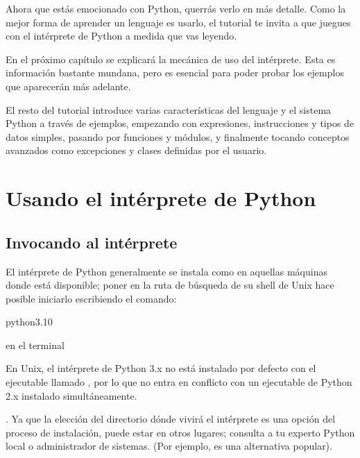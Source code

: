 \documentclass[a4,10pt,spanish]{sphinxmanual}
\begin{document}
\sphinxAtStartPar
Ahora que estás emocionado con Python, querrás verlo en más detalle. Como la mejor forma de aprender un lenguaje es usarlo, el tutorial te invita a que juegues con el intérprete de Python a medida que vas leyendo.

\sphinxAtStartPar
En el próximo capítulo se explicará la mecánica de uso del intérprete. Esta es información bastante mundana, pero es esencial para poder probar los ejemplos que aparecerán más adelante.

\sphinxAtStartPar
El resto del tutorial introduce varias características del lenguaje y el sistema Python a través de ejemplos, empezando con expresiones, instrucciones y tipos de datos simples, pasando por funciones y módulos, y finalmente tocando conceptos avanzados como excepciones y clases definidas por el usuario.


\chapter{Usando el intérprete de Python}
\label{\detokenize{tutorial/interpreter:using-the-python-interpreter}}\label{\detokenize{tutorial/interpreter:tut-using}}\label{\detokenize{tutorial/interpreter::doc}}

\section{Invocando al intérprete}
\label{\detokenize{tutorial/interpreter:invoking-the-interpreter}}\label{\detokenize{tutorial/interpreter:tut-invoking}}
\sphinxAtStartPar
El intérprete de Python generalmente se instala como  en aquellas máquinas donde está disponible; poner  en la ruta de búsqueda de su shell de Unix hace posible iniciarlo escribiendo el comando:

\begin{sphinxVerbatim}[commandchars=\\\{\}]
python3.10
\end{sphinxVerbatim}

\sphinxAtStartPar
en el terminal %
\begin{footnote}[1]\sphinxAtStartFootnote
En Unix, el intérprete de Python 3.x no está instalado por defecto con el ejecutable llamado , por lo que no entra en conflicto con un ejecutable de Python 2.x instalado simultáneamente.
%
\end{footnote}. Ya que la elección del directorio dónde vivirá el intérprete es una opción del proceso de instalación, puede estar en otros lugares; consulta a tu experto Python local o administrador de sistemas. (Por ejemplo,  es una alternativa popular).
\end{document}
